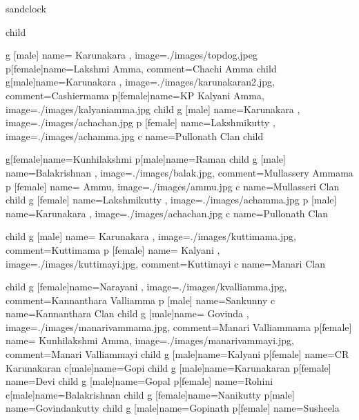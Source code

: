 \documentclass{article}
\begin{document}
\begin{landscape}
\begin{genealogypicture} [
processing=database,
database format=medium marriage below,
node size=2.4cm,
level size=3.5cm,
level distance=6mm,
list separators hang,
name font=\bfseries,
surn code={\textcolor{red!50!black}{#1}},
place text={\newline}{},
date format=d/mon/yyyy,
tcbset={male/.style={colframe=blue,colback=blue!5},
female/.style={colframe=red,colback=red!5}},
box={fit basedim=7pt,boxsep=2pt,segmentation style=solid,
halign=left,before upper=\parskip1pt,
\gtrDBsex,drop fuzzy shadow,
if image defined={add to width=25mm,right=25mm,
underlay={\begin{tcbclipinterior}\path[fill overzoom DBimage]
([xshift=-24mm]interior.south east) rectangle (interior.north east);
\end{tcbclipinterior}},
}{},
},
]

sandclock {
	child {
  		g [male]  {name={ Karunakara }, image={./images/topdog.jpeg}}
  		p[female]{name={Lakshmi Amma}, comment={Chachi Amma}}
  		child {
  			 g[male]{name=Karunakara , image={./images/karunakaran2.jpg}, comment={Cashiermama}}
   			p[female]{name={KP Kalyani Amma}, image={./images/kalyaniamma.jpg}}
   			child {
    				g [male] {name=Karunakara , image={./images/achachan.jpg}}
    				p [female] {name=Lakshmikutty , image={./images/achamma.jpg}}
				c {name=Pullonath Clan}
   			}
  		}
  		child {
   			g[female]{name={Kunhilakshmi }}
   			p[male]{name={Raman }}
   			child {
    				g [male] {name=Balakrishnan  , image={./images/balak.jpg}, comment={Mullassery Ammama}}
    				p [female] {name= Ammu, image={./images/ammu.jpg}}
				c {name=Mullasseri Clan}
   			}
			child {
    				g [female] {name=Lakshmikutty , image={./images/achamma.jpg}}
				p [male] {name=Karunakara , image={./images/achachan.jpg}}
				c {name=Pullonath Clan}
   			}

			child {
    				g [male] {name= Karunakara , image={./images/kuttimama.jpg}, comment={Kuttimama}}
				p [female] {name= Kalyani , image={./images/kuttimayi.jpg}, comment={Kuttimayi}}
				c {name=Manari Clan}
   			}
  		}
  		child {
   			g [female]{name={Narayani }, image={./images/kvalliamma.jpg}, comment={Kannanthara Valliamma}}
   			p [male] {name={Sankunny }}
			c {name=Kannanthara Clan}
  		}
  		child {
   			g [male]{name={ Govinda }, image={./images/manarivammama.jpg},  comment={Manari Valliammama}}
   			p[female] {name={ Kunhilakshmi Amma}, image={./images/manarivammayi.jpg},  comment={Manari Valliammayi}}
			child {
   				g [male]{name=Kalyani}
   				p[female] {name=CR Karunakaran}
  			}
			c[male]{name=Gopi}
			child {
   				g [male]{name=Karunakaran}
   				p[female] {name=Devi}
  			}
			child {
   				g [male]{name=Gopal}
   				p[female] {name=Rohini}
  			}
			c[male]{name=Balakrishnan}
			child {
   				g [female]{name=Nanikutty}
   				p[male] {name=Govindankutty}
  			}
			child {
   				g [male]{name=Gopinath}
   				p[female] {name=Susheela}
  			}
  		}
	}
}


\end{genealogypicture}
\end{landscape}
\end{document}
